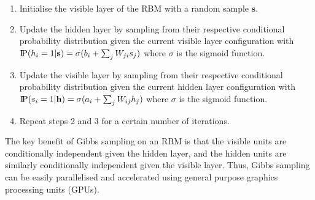 \begin{enumerate}
    \item Initialise the visible layer of the RBM with a random sample $\mathbf{s}$.
    \item Update the hidden layer by sampling from their respective conditional probability distribution given the current visible layer configuration with $\text{I\kern-0.15em P}(h_i=1|\mathbf{s}) = \sigma(b_i + \sum_j W_{ji}s_j)$ where $\sigma$ is the sigmoid function.
    \item Update the visible layer by sampling from their respective conditional probability distribution given the current hidden layer configuration with $\text{I\kern-0.15em P}(s_i=1|\mathbf{h}) = \sigma(a_i + \sum_j W_{ij}h_j)$ where $\sigma$ is the sigmoid function.
    \item Repeat steps 2 and 3 for a certain number of iterations.
\end{enumerate}

The key benefit of Gibbs sampling on an RBM is that the visible units are conditionally independent given the hidden layer, and the hidden units are similarly conditionally independent given the visible layer. Thus, Gibbs sampling can be easily parallelised and accelerated using general purpose graphics processing units (GPUs).